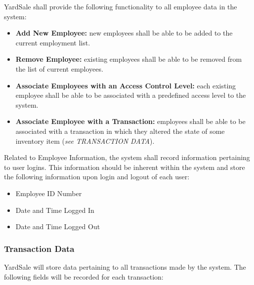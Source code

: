 \documentclass{report}
\begin{document}
                \noindent YardSale shall provide the following functionality
                to all employee data in the system:

                \begin{itemize}
                    \item {\bf Add New Employee:} new employees
                    shall be able to be added to the current
                    employment list.
                    \item {\bf Remove Employee:} existing
                    employees shall be able to be removed from the
                    list of current employees.
                    \item {\bf Associate Employees with an Access Control Level:}
                    each existing employee shall be able to be
                    associated with a predefined access level to
                    the system.
                    \item {\bf Associate Employee with a Transaction:}
                    employees shall be able to be
                    associated with a transaction in which they
                    altered the state of some inventory item ({\sl see
                    TRANSACTION DATA}).
                \end{itemize}

                \noindent Related to Employee Information, the
                system shall record information pertaining to user
                logins.  This information should be inherent
                within the system and store the following
                information upon login and logout of each user:
                \begin{itemize}
                    \item Employee ID Number
                    \item Date and Time Logged In
                    \item Date and Time Logged Out
                \end{itemize}

            \subsubsection{Transaction Data}
                YardSale will store data pertaining to all
                transactions made by the system.
                The following fields will be recorded for each
                transaction:
\end{document}

